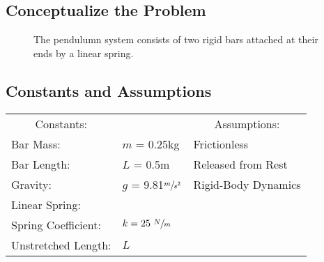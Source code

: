 \documentclass[12pt]{report}
\begin{document}

{\tableofcontents\let\clearpage\relax\listoffigures}
\clearpage
{}
\newpage
\begin{flushleft}
\section{Conceptualize the Problem}

\begin{figure}[h]
  \begin{minipage}[c]{.4\textwidth}
  
\end{minipage}%
\begin{minipage}[c]{.6\textwidth}
  The pendulumn system consists of two rigid bars attached at their ends by a linear spring.
\end{minipage}
\end{figure}

\subsection{Constants and Assumptions}
\begin{tabular}{ll@{\hskip .75in}l}
 \multicolumn{1}{c}{Constants:} && \multicolumn{1}{c}{Assumptions:} \\
 Bar Mass: &$m$ = 0.25kg & Frictionless\\
 Bar Length: &$L$ = 0.5m & Released from Rest\\
 Gravity: &$g$ = 9.81$\sfrac{m}{s^2}$ &Rigid-Body Dynamics \\
 Linear Spring: \\
 \quad Spring Coefficient:& $k = 25~\sfrac{N}{m}$\\
 \quad Unstretched Length:& $L$ \\
\end{tabular}
\vspace{5ex}


\end{flushleft}
\end{document}
